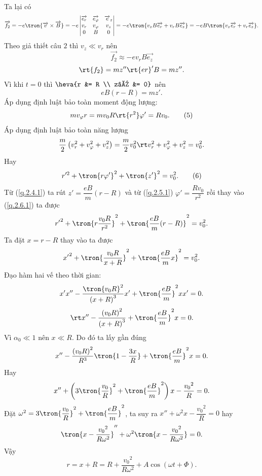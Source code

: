 \begin{loigiai}
\begin{enumerate}[1)]
Ta lại có 
\[\overrightarrow{{{f}_{2}}}=-e \tron{\overrightarrow{v}\times \overrightarrow{B}} = -e\left| \begin{matrix}
   \overrightarrow{{{e}_{r}}} & \overrightarrow{{{e}_{\varphi }}} & {{\overrightarrow{e}}_{z}}  \\
   {{v}_{r}} & {{v}_{\varphi }} & {{v}_{z}}  \\
   0 & B & 0  \\
\end{matrix} \right| = -e \tron{{{v}_{z}}B\overrightarrow{{{e}_{r}}}+{{v}_{r}} B\overrightarrow{{{e}_{z}}}} = -eB\tron{{{v}_{z}}\overrightarrow{{{e}_{r}}}+{{v}_{r}}\overrightarrow{{{e}_{z}}}}.\]
Theo giả thiết câu $2$ thì ${{v}_{z}} \ll {{v}_{r}}$ nên \[\overrightarrow{{{f}_{2}}}\approx -e{{v}_{r}}B\overrightarrow{{{e}_{z}}}\]
\[\rt {{f}_{2}}=mz''\rt {er}'B=mz''.\]
Vì khi $t = 0$ thì $\heva{r &= R \\ z’ &= 0}$ nên 
\[e B (r-R) = mz' \tag{4} \label{q.2.4.1}.\]
Áp dụng định luật bảo toàn moment động lượng:
\[m{{v}_{\varphi }}r = m{{v}_{0}}R \rt {{r}^{2}}\varphi '=R{{v}_{0}}. \tag{5} \label{q.2.5.1}\]
Áp dụng định luật bảo toàn năng lượng
\[\dfrac{m}{2} \left( v_r^2 + v_\varphi^2 + v_z^2\right) = \dfrac{m}{2}v_0^2 \rt v_{r}^{2}+v_{\varphi }^{2}+v_{z}^{2} = v_{0}^{2}.\] 
Hay 
\[r'^2+{{\tron{r\varphi'}}^{2}}+{{\tron{z'}}^{2}} = v_{0}^{2}.\tag{6} \label{q.2.6.1}\]  
Từ (\ref{q.2.4.1}) ta rút $z'=\dfrac{eB}{m}(r-R)$  và từ (\ref{q.2.5.1}) $\varphi '=\dfrac{R{{v}_{0}}}{{{r}^{2}}}$ rồi thay vào (\ref{q.2.6.1}) ta được
\[r{{'}^{2}} + \tron{{r\dfrac{{{v}_{0}}R}{{{r}^{2}}}}}^{2}+ \tron{{\dfrac{eB}{m}(r-R)}}^{2} = v_{0}^{2}.\]
Ta đặt $x = r-R$ thay vào ta được 
\[x{{'}^{2}} + \tron{{\dfrac{{{v}_{0}}R}{x+R}}}^{2} + \tron{{\dfrac{eB}{m}x}}^{2} = v_{0}^{2}.\]
Đạo hàm hai vế theo thời gian:
\[x'x''-\dfrac{{{\tron{{v}_{0}R}}^{2}}}{{{(x+R)}^{3}}}x'+\tron{{\dfrac{eB}{m}}}^{2}xx'=0.\]
\[\rt x''-\dfrac{{{({{v}_{0}}R)}^{2}}}{{{(x+R)}^{3}}} + \tron{{\dfrac{eB}{m}}}^{2}x=0.\]
Vì ${{\alpha }_{0}} \ll 1$  nên $x \ll R$. Do đó ta lấy gần đúng
\[x''-\dfrac{{{({{v}_{0}}R)}^{2}}}{{{R}^{3}}}\tron{1-\dfrac{3x}{R}}+{\tron{\dfrac{eB}{m}}^{2}}x=0.\]
Hay
\[x''+\left( 3{\tron{\dfrac{{{v}_{0}}}{R}}^{2}}+{\tron{\dfrac{eB}{m}}^{2}} \right)x-\dfrac{{{v}_{0}}^{2}}{R} = 0.\]
Đặt ${{\omega }^{2}} =  3{\tron{\dfrac{{{v}_{0}}}{R}}^{2}}+{\tron{\dfrac{eB}{m}}^{2}} $, ta suy ra $x''+{{\omega }^{2}}x-\dfrac{{{v}_{0}}^{2}}{R}=0$
hay
\[\tron{x-\dfrac{{{v}_{0}}^{2}}{R{{\omega }^{2}}}}''+{{\omega }^{2}}\tron{x - \dfrac{{{v}_{0}}^{2}}{R{{\omega }^{2}}}}=0.\]
Vậy 
\[r = x + R = R + \dfrac{{{v}_{0}}^{2}}{R{{\omega }^{2}}}+A\cos (\omega t+\Phi ). \tag{7}\label{q.2.7.1}\]

\end{enumerate}
\end{loigiai}
